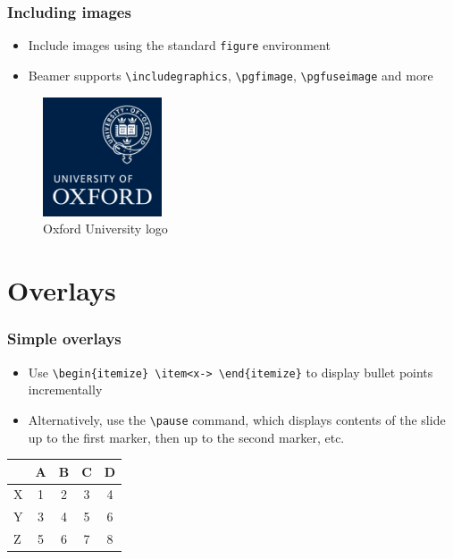 \documentclass[xcolor=pdftex,t,11pt]{beamer}
\begin{document}
\begin{frame}[fragile]
\frametitle{Including images}
\begin{itemize}
\item Include images using the standard \verb!figure! environment
\item Beamer supports \verb!\includegraphics!, \verb!\pgfimage!, \verb!\pgfuseimage! and more
\end{itemize}
\begin{figure}
\includegraphics[height=100pt]{images/titlepage/ou}
\caption{Oxford University logo}
\end{figure}
\end{frame}


\section{Overlays}


\begin{frame}[fragile]
\frametitle{Simple overlays}
\begin{itemize}
\item<1-> Use \verb!\begin{itemize} \item<x-> \end{itemize}! to display bullet points incrementally
\item<2-> Alternatively, use the \verb!\pause! command, which displays contents of the slide up to the first marker, then up to the second marker, etc.
\end{itemize}
\pause
\begin{table}
\begin{tabular}{lcccc}
        & A & B & C & D \\\hline
  X     & 1 & 2 & 3 & 4 \pause\\
  Y     & 3 & 4 & 5 & 6 \pause\\
  Z     & 5 & 6 & 7 & 8
\end{tabular}
\end{table}
\end{frame}
\end{document}
